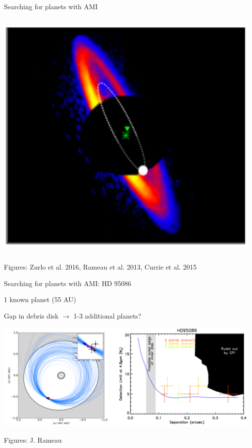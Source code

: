 \documentclass[10pt]{beamer}
\newenvironment{wideitemize}{\itemize\addtolength{\itemsep}{10pt}}{\enditemize}
\begin{document}
\begin{frame}{Searching for planets with AMI}
\begin{columns}
    \includegraphics[width=\textwidth]{figures/hd115600.png}
  \end{columns}

  \footnotesize Figures: Zurlo et al. 2016, Rameau et al. 2013, Currie et al. 2015
\end{frame}

\begin{frame}{Searching for planets with AMI: HD 95086}
  \begin{wideitemize}
    \item 1 known planet (55 AU)
    \item Gap in debris disk $\rightarrow$ 1-3 additional planets?
  \end{wideitemize}
  \begin{center}
    \includegraphics[width=\linewidth]{figures/hd95086_contrast.png}
  \end{center}

  \footnotesize Figures: J. Rameau
\end{frame}
\end{document}
